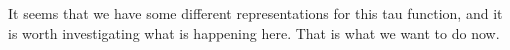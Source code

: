 \documentclass[a4paper,11pt]{amsart}
\begin{document}
It seems that we have some different representations for this tau function, 
and it is worth investigating what is happening here. That is what we want 
to do now. 


%
%
%
%
%
%
%
%
%


\printbibliography
\end{document}
